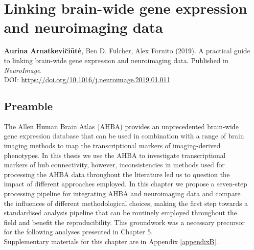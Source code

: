 \chapter{Linking brain-wide gene expression and neuroimaging data}
\label{ch:Chapter4}



\textbf{Aurina Arnatkevi\u{c}i\={u}t\.{e}},
Ben D. Fulcher,
Alex Fornito (2019).
A practical guide to linking brain-wide gene expression and neuroimaging data. Published in \textit{NeuroImage}.\\
DOI: \url{https://doi.org/10.1016/j.neuroimage.2019.01.011}

\section*{Preamble}
The Allen Human Brain Atlas (AHBA) provides an unprecedented brain-wide gene expression database that can be used in combination with a range of brain imaging methods to map the transcriptional markers of imaging-derived phenotypes. In this thesis we use the AHBA to investigate transcriptional markers of hub connectivity, however, inconsistencies in methods used for processing the AHBA data throughout the literature led us to question the impact of different approaches employed. In this chapter we propose a seven-step processing pipeline for integrating AHBA and neuroimaging data and compare the influences of different methodological choices, making the first step towards a standardised analysis pipeline that can be routinely employed throughout the field and benefit the reproducibility. This groundwork was a necessary precursor for the following analyses presented in Chapter 5.\\
Supplementary materials for this chapter are in Appendix \ref{appendixB}.

\newpage

